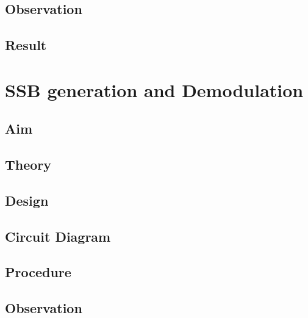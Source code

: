 \documentclass{book}
\begin{document}
\section*{Observation}
\section*{Result}
\chapter[SSB generation and Demodulation]{SSB generation and Demodulation}
\section*{Aim}
\section*{Theory}
\section*{Design}
\section*{Circuit Diagram}
\section*{Procedure}
\section*{Observation}
\end{document}
